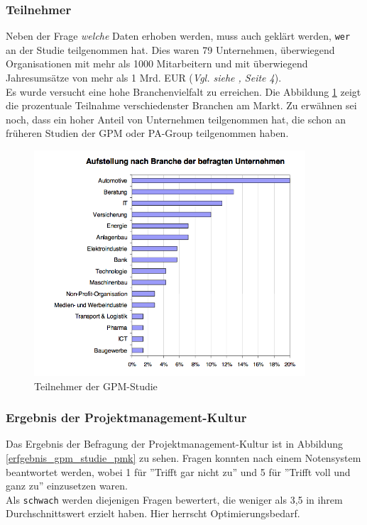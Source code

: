 \documentclass[12pt]{scrartcl}
\begin{document}
\subsubsection{Teilnehmer}

Neben der Frage \textit{welche} Daten erhoben werden, muss auch geklärt werden, \texttt{wer} an der Studie teilgenommen hat. Dies waren 79 Unternehmen, überwiegend Organisationen mit mehr als 1000 Mitarbeitern und mit überwiegend Jahresumsätze von mehr als 1 Mrd. EUR (\textit{Vgl. siehe \cite{GPM_Studie_2008}, Seite 4}).\\
Es wurde versucht eine hohe Branchenvielfalt zu erreichen. Die Abbildung \ref{teilnehmer_gpm_studie} zeigt die prozentuale Teilnahme verschiedenster Branchen am Markt. Zu erwähnen sei noch, dass ein hoher Anteil von Unternehmen teilgenommen hat, die schon an früheren Studien der GPM oder PA-Group teilgenommen haben. 

\begin{figure}[H]
	\begin{center}
		\includegraphics[width=0.9\textwidth]{img/teilnehmer_gpm_studie}
		\caption{Teilnehmer der GPM-Studie}
		\label{teilnehmer_gpm_studie}	
	\end{center}
\end{figure}

\subsubsection{Ergebnis der Projektmanagement-Kultur}
\label{ergebnis_pmk}
Das Ergebnis der Befragung der Projektmanagement-Kultur ist in Abbildung \ref{erfgebnis_gpm_studie_pmk} zu sehen. Fragen konnten nach einem Notensystem beantwortet werden, wobei 1 für ''Trifft gar nicht zu'' und 5 für ''Trifft voll und ganz zu'' einzusetzen waren. \\
Als \texttt{schwach} werden diejenigen Fragen bewertert, die weniger als 3,5 in ihrem Durchschnittswert erzielt haben. Hier herrscht Optimierungsbedarf. 
\end{document}
